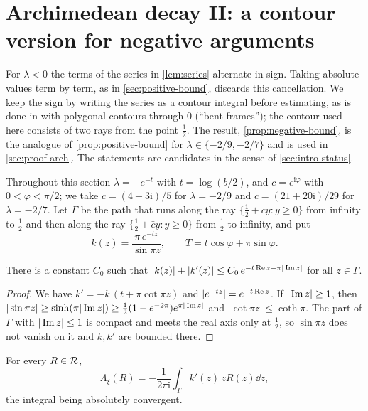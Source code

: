 \section{Archimedean decay II: a contour version for negative arguments}\label{sec:contour}

For $\lambda<0$ the terms of the series in \cref{lem:series} alternate in sign. Taking absolute values term by term, as in \cref{sec:positive-bound}, discards this cancellation. We keep the sign by writing the series as a contour integral before estimating, as is done in \cite[Sections~6.1 and~6.3]{Litsey2026Li2} with polygonal contours through $0$ (``bent frames''); the contour used here consists of two rays from the point $\frac12$. The result, \cref{prop:negative-bound}, is the analogue of \cref{prop:positive-bound} for $\lambda\in\{-2/9,-2/7\}$ and is used in \cref{sec:proof-arch}. The statements are candidates in the sense of \cref{sec:intro-status}.

Throughout this section $\lambda=-e^{-t}$ with $t=\log(b/2)$, and $c=e^{\mathrm i\varphi}$ with $0<\varphi<\pi/2$; we take $c=(4+3\mathrm i)/5$ for $\lambda=-2/9$ and $c=(21+20\mathrm i)/29$ for $\lambda=-2/7$. Let $\Gamma$ be the path that runs along the ray $\{\frac12+cy:y\ge0\}$ from infinity to $\frac12$ and then along the ray $\{\frac12+\bar cy:y\ge0\}$ from $\frac12$ to infinity, and put
\[
k(z)=\frac{\pi\,e^{-tz}}{\sin\pi z},\qquad T=t\cos\varphi+\pi\sin\varphi .
\]

\begin{lemma}\label{lem:kernel-bound}
There is a constant $C_0$ such that $|k(z)|+|k'(z)|\le C_0\,e^{-t\operatorname{Re} z-\pi|\operatorname{Im} z|}$ for all $z\in\Gamma$.
\end{lemma}

\begin{proof}
We have $k'=-k\,(t+\pi\cot\pi z)$ and $|e^{-tz}|=e^{-t\operatorname{Re} z}$. If $|\operatorname{Im} z|\ge1$, then $|\sin\pi z|\ge\sinh(\pi|\operatorname{Im} z|)\ge\frac12(1-e^{-2\pi})e^{\pi|\operatorname{Im} z|}$ and $|\cot\pi z|\le\coth\pi$. The part of $\Gamma$ with $|\operatorname{Im} z|\le1$ is compact and meets the real axis only at $\frac12$, so $\sin\pi z$ does not vanish on it and $k,k'$ are bounded there.
\end{proof}

\begin{lemma}\label{lem:contour}
For every $R\in\mathcal{R}$,
\[
\Lambda_\xi(R)=-\frac1{2\pi\mathrm i}\int_\Gamma k'(z)\,zR(z)\dd z ,
\]
the integral being absolutely convergent.
\end{lemma}

